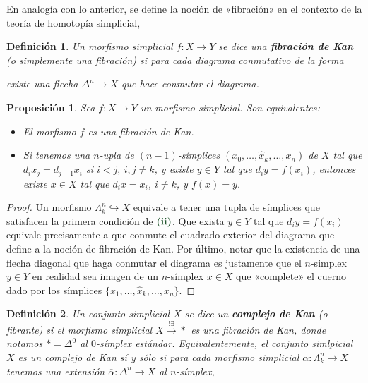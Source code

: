 \documentclass[11pt]{report}
\theoremstyle{colored}
\newtheorem{definition}{Definición}[section]
\newtheorem{proposition}{Proposición}[section]
\renewcommand{\ss}[1]{\Delta^{#1}}
\newcommand{\horn}[2]{\Lambda^{#1}_{#2}}
\newcommand{\guill}[1]{«#1»}
\newcommand{\paint}[1]{\color{color}{#1}}
\newcommand{\tpaint}[1]{\paint{\textbf{#1}}}
\begin{document}
En analogía con lo anterior, se define la noción de \guill{fibración} en el contexto de la teoría de homotopía simplicial,

\begin{definition} Un morfismo simplicial $f : X \to Y$ se dice una \textbf{fibración de Kan} (o simplemente una fibración) si para cada diagrama conmutativo de la forma
\begin{center}
\end{center}
existe una flecha $\ss{n} \to X$ que hace conmutar el diagrama.
\end{definition}

\begin{proposition}\label{equiv-fib-kan} Sea $f : X \to Y$ un morfismo simplicial. Son equivalentes:
\begin{itemize}
\item[(i)] El morfismo $f$ es una fibración de Kan.
\item[(ii)] Si tenemos una $n$-upla de $(n-1)$-símplices $(x_0,\dots,\widehat{x}_k,\dots, x_n)$ de $X$ tal que $d_ix_j = d_{j-1}x_i$ si $i < j, \ i,j \neq k$, y existe $y \in Y$ tal que $d_iy = f(x_i)$, entonces existe $x \in X$ tal que $d_ix = x_i$, $i \neq k$, y $f(x) = y$.
\end{itemize}
\end{proposition}
\begin{proof} Un morfismo $\horn{n}{k} \hookrightarrow X$ equivale a tener una tupla de símplices que satisfacen la primera condición de $\tpaint{(ii)}$. Que exista $y \in Y$ tal que $d_iy = f(x_i)$ equivale precisamente a que conmute el cuadrado exterior del diagrama que define a la noción de fibración de Kan. Por último, notar que la existencia de una flecha diagonal que haga conmutar el diagrama es justamente que el $n$-simplex $y \in Y$ en realidad sea imagen de un $n$-símplex $x \in X$ que \guill{complete} el cuerno dado por los símplices $\{x_1, \dots, \widehat{x}_k,\dots, x_n\}$.
\end{proof}

\begin{definition} Un conjunto simplicial $X$ se dice un \textbf{complejo de Kan} (o fibrante) si el morfismo simplicial $X \xrightarrow{!\exists} \ast$ es una fibración de Kan, donde notamos $\ast = \ss{0}$ al $0$-símplex estándar. Equivalentemente, el conjunto simlpicial $X$ es un complejo de Kan sí y sólo si para cada morfismo simplicial $\alpha : \horn{n}{k} \to X$ tenemos una extensión $\overline{\alpha} : \ss{n} \to X$ al $n$-símplex,
\begin{center}
\end{center}
\end{definition}
\end{document}
